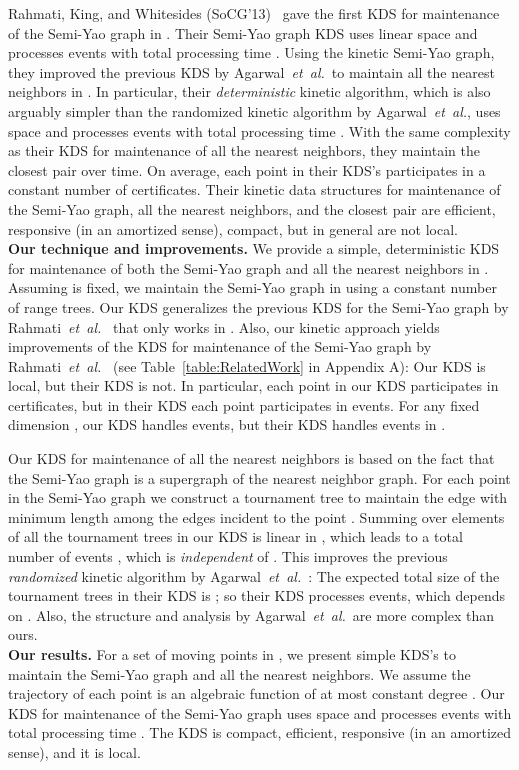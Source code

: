 \documentclass[11pt]{llncs}
\newcommand{\etal}{\emph{et~al.}}
\begin{document}
Rahmati, King, and Whitesides (SoCG'13)~\cite{socg17-rahmati} gave the first KDS for maintenance of the Semi-Yao graph in . Their Semi-Yao graph KDS uses linear space and processes  events with total processing time . Using the kinetic Semi-Yao graph, they improved the previous KDS by Agarwal~\etal~to maintain all the nearest neighbors in . In particular, their \textit{deterministic} kinetic algorithm, which is also arguably simpler than the randomized kinetic algorithm by Agarwal~\etal, uses  space and processes  events with total processing time . With the same complexity as their KDS for maintenance of all the nearest neighbors, they maintain the closest pair over time. On average, each point in their KDS's participates in a constant number of certificates. Their kinetic data structures for maintenance of the Semi-Yao graph, all the nearest neighbors, and the closest pair are efficient, responsive (in an amortized sense), compact, but in general are not local.  
\vspace{+5pt}
\\
\textbf{Our technique and improvements.}
We provide a simple, deterministic KDS for maintenance of both the Semi-Yao graph and all the nearest neighbors in .  Assuming  is fixed, we maintain the Semi-Yao graph in  using a constant number of range trees. Our KDS generalizes the previous KDS for the Semi-Yao graph by Rahmati~\etal~\cite{socg17-rahmati} that only works in . Also, our kinetic approach yields improvements of the KDS for maintenance of the Semi-Yao graph by Rahmati~\etal~\cite{socg17-rahmati} (see Table~\ref{table:RelatedWork} in Appendix A): Our KDS is local, but their KDS is not. In particular, each point in our KDS participates in  certificates, but  in their KDS each point participates in  events. For any fixed dimension , our KDS handles  events, but their KDS handles  events in . 

Our KDS for maintenance of all the nearest neighbors is based on the fact that the Semi-Yao graph is a supergraph of the nearest neighbor graph. For each point  in the Semi-Yao graph we construct a tournament tree to maintain the edge with minimum length among the edges incident to the point . Summing over elements of all the tournament trees in our KDS is linear in , which leads to a total number of events , which is \textit{independent} of . This improves the previous \textit{randomized} kinetic algorithm by Agarwal~\etal~\cite{Agarwal:2008:KDD:1435375.1435379}: The expected total size of the tournament trees in their KDS is ; so their KDS processes  events, which depends on . Also, the structure and analysis by Agarwal~\etal~are more complex than ours.
\vspace{+5pt}
\\
\textbf{Our results.}
For a set of  moving points in , we present simple KDS's to maintain the Semi-Yao graph and all the nearest neighbors. We assume the trajectory of each point is an algebraic function of at most constant degree . Our KDS for maintenance of the Semi-Yao graph uses  space and processes  events with total processing time .  The KDS is compact, efficient, responsive (in an amortized sense), and it is local.
\end{document}
